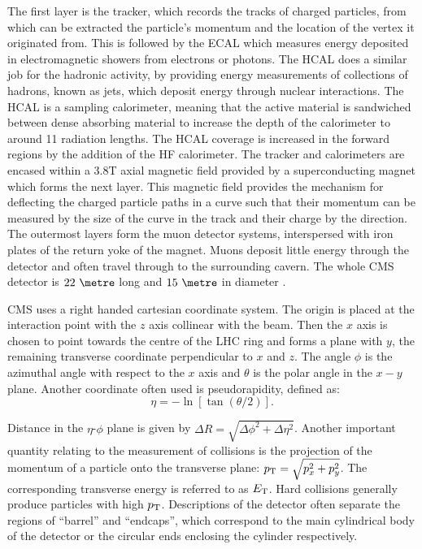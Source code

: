 The first layer is the tracker, which records the tracks of charged particles,
from which can be extracted the particle's momentum and the location of the
vertex it originated from. This is followed by the \ac{ECAL} which measures
energy deposited in electromagnetic showers from electrons or photons. The
\ac{HCAL} does a similar job for the hadronic activity, by providing energy
measurements of collections of hadrons, known as jets, which deposit energy
through nuclear interactions. The \ac{HCAL} is a sampling calorimeter, meaning
that the active material is sandwiched between dense absorbing material to
increase the depth of the calorimeter to around 11 radiation lengths. The
\ac{HCAL} coverage is increased in the forward regions by the addition of 
the \ac{HF} calorimeter. The tracker and calorimeters are encased within a 3.8T axial magnetic
field provided by a superconducting magnet which forms the next layer. This
magnetic field provides the mechanism for deflecting the charged particle paths in
a curve such that their momentum can be measured by the size of the curve in the
track and their charge by the direction. The
outermost layers form the muon detector systems, interspersed with iron plates
of the return yoke of the magnet. Muons deposit little energy
through the detector and often travel through to the surrounding cavern. The
whole CMS detector is $22~\metre$ long and $15~\metre$ in diameter
\cite{Chatrchyan:2008aa}.

CMS uses a right handed cartesian coordinate system. The
origin is placed at the interaction point with the $z$ axis collinear with the
beam. Then the $x$ axis is chosen to point towards the centre of the LHC ring
and forms a plane with $y$, the remaining transverse coordinate perpendicular to
$x$ and $z$. The angle $\phi$ is the azimuthal angle with respect to the $x$
axis and $\theta$ is the polar angle in the $x-y$ plane. Another coordinate
often used is pseudorapidity, defined as:
\begin{equation}
\eta = - \ln[\tan(\theta/2)]. 
\end{equation}

Distance in the $\eta$-$\phi$ plane is given by $\Delta R =
\sqrt{\Delta\phi^{2} + \Delta\eta^{2}}$.
Another important quantity relating to the measurement of collisions is the
projection of the momentum of a particle onto the transverse plane: $p_{\mathrm{T}} =
\sqrt{p_{x}^{2} + p_{y}^{2}}$. The corresponding transverse energy is referred
to as $E_{\text T}$. Hard collisions generally produce particles with
high $p_{\mathrm{T}}$. Descriptions of the detector often separate the regions of
``barrel'' and ``endcaps'', which correspond to the main cylindrical body of
the detector or the circular ends enclosing the cylinder respectively. 

